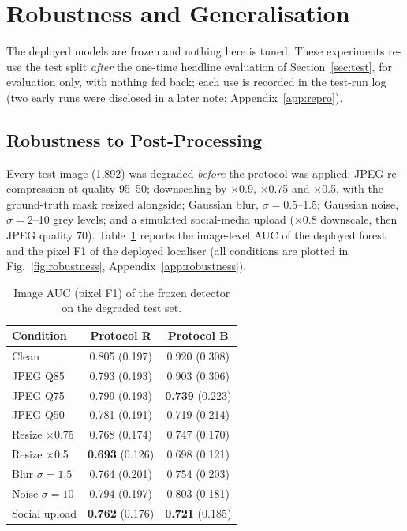 \section{Robustness and Generalisation}\label{sec:robustness}
The deployed models are frozen and nothing here is tuned. These experiments re-use the test split \emph{after}
the one-time headline evaluation of Section~\ref{sec:test}, for evaluation only, with nothing fed back; each use
is recorded in the test-run log (two early runs were disclosed in a later note; Appendix~\ref{app:repro}).

\subsection{Robustness to Post-Processing}\label{sec:rob-degrade}
Every test image (1,892) was degraded \emph{before} the protocol was applied: JPEG re-compression at quality
95--50; downscaling by $\times$0.9, $\times$0.75 and $\times$0.5, with the ground-truth mask resized alongside;
Gaussian blur, $\sigma=0.5$--1.5; Gaussian noise, $\sigma=2$--10 grey levels; and a simulated social-media upload
($\times$0.8 downscale, then JPEG quality 70). Table~\ref{tab:rob-degrade} reports
the image-level AUC of the deployed forest and the pixel F1 of the deployed localiser (all conditions are plotted
in Fig.~\ref{fig:robustness}, Appendix~\ref{app:robustness}).

\begin{table}[t]
\centering
\caption{Image AUC (pixel F1) of the frozen detector on the degraded test set.}\label{tab:rob-degrade}
\footnotesize
\begin{tabular}{lcc}
\toprule
Condition & Protocol R & Protocol B \\
\midrule
Clean               & 0.805 (0.197) & 0.920 (0.308) \\
JPEG Q85            & 0.793 (0.193) & 0.903 (0.306) \\
JPEG Q75            & 0.799 (0.193) & \textbf{0.739} (0.223) \\
JPEG Q50            & 0.781 (0.191) & 0.719 (0.214) \\
Resize $\times$0.75 & 0.768 (0.174) & 0.747 (0.170) \\
Resize $\times$0.5  & \textbf{0.693} (0.126) & 0.698 (0.121) \\
Blur $\sigma=1.5$   & 0.764 (0.201) & 0.754 (0.203) \\
Noise $\sigma=10$   & 0.794 (0.197) & 0.803 (0.181) \\
Social upload       & \textbf{0.762} (0.176) & \textbf{0.721} (0.185) \\
\bottomrule
\end{tabular}
\end{table}


